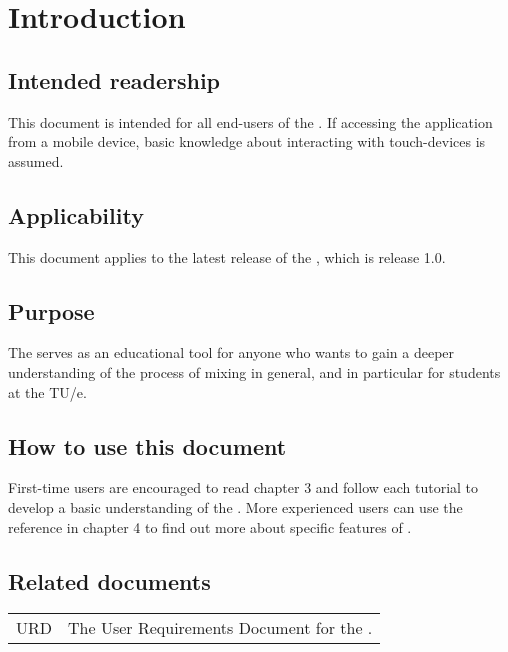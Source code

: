 \chapter{Introduction}

\section{Intended readership}
This document is intended for all end-users of the \applicationname{}. If accessing the application from a mobile device, basic knowledge about interacting with touch-devices is assumed.

\section{Applicability}
This document applies to the latest release of the \applicationname{}, which is release 1.0.

\section{Purpose}
The \applicationname{} serves as an educational tool for anyone who wants to gain a deeper understanding of the process of mixing in general, and in particular for students at the TU/e.

\section{How to use this document}
First-time users are encouraged to read chapter 3 and follow each tutorial to develop a basic understanding of the \applicationname{}.
More experienced users can use the reference in chapter 4 to find out more about specific features of \projectname{}.

\section{Related documents}
\begin{tabular}{l l}
URD & The User Requirements Document for the \applicationname{}.\\
\end{tabular}

